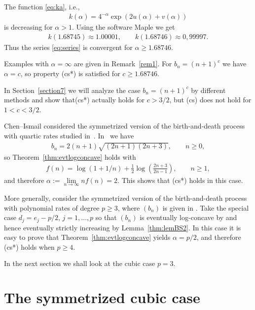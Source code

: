 \documentclass[pdftex]{sigma}
\numberwithin{equation}{section}
\begin{document}
\begin{rem}\label{thm:rem4} The function \eqref{eq:ka}, i.e.,
\begin{gather*}
 k(\alpha)=4^{-\alpha}\exp(2u(\alpha)+v(\alpha))
\end{gather*}
is decreasing for $\alpha>1$. Using the software Maple we get
\begin{gather*}
 k(1.68745)\approx 1.00001,\qquad k(1.68746)\approx 0,99997.
\end{gather*}
Thus the series \eqref{eq:series} is convergent for $\alpha\ge 1.68746$.

Examples with $\alpha=\infty$ are given in Remark~\ref{rem1}. For $b_n=(n+1)^c$ we have $\alpha=c$, so property (cs*) is satisfied for $c\ge 1.68746$.

In Section~\ref{section7} we will analyze the case $b_n=(n+1)^c$ by different methods and show that(cs*) actually holds for $c>3/2$, but (cs) does not hold for $1<c<3/2$.
\end{rem}

\begin{rem}Chen--Ismail \cite{Ch:I} considered the symmetrized version of the birth-and-death process with quartic rates studied in~\cite{B:V}. In~\cite{Ch:I} we have
 \begin{gather*}
b_n=2(n+1)\sqrt{(2n+1)(2n+3)},\qquad n\ge 0,
\end{gather*}
so Theorem~\ref{thm:evtlogconcave} holds with
\begin{gather*}
f(n)=\log(1+1/n)+\frac12\log\left(\frac{2n+3}{2n-1}\right),\qquad n\ge 1,
\end{gather*}
and therefore $\alpha:=\lim\limits_{n\to\infty} nf(n)=2$. This shows that (cs*) holds in this case.

More generally, consider the symmetrized version of the birth-and-death process with polynomial rates of degree $p\ge 3$, where $(b_n)$ is given in \cite[Proposition~3.2]{B:S3}. Take the special case $d_j=e_j-p/2$, $j=1,\ldots,p$ so that $(b_n)$ is eventually log-concave by \cite[Proposition~6.2]{B:S3} and hence eventually strictly increasing by Lemma~\ref{thm:lemBS2}. In this case it is easy to prove that Theorem~\ref{thm:evtlogconcave} yields $\alpha=p/2$, and therefore (cs*) holds when $p\ge 4$.

In the next section we shall look at the cubic case $p=3$.
\end{rem}

\section{The symmetrized cubic case}\label{section6}
\end{document}
